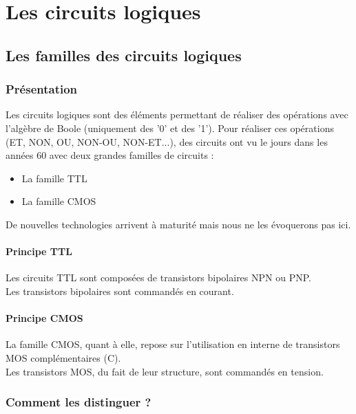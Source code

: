 \part{Les circuits logiques}
\chapter{Les familles des circuits logiques}

\section{Présentation}

Les circuits logiques sont des éléments permettant de réaliser des opérations avec l'algèbre de Boole (uniquement des '0' et des '1').
Pour réaliser ces opérations (ET, NON, OU, NON-OU, NON-ET...), des circuits ont vu le jours dans les années 60 avec deux grandes familles de circuits : \\
\begin{itemize}
    \item La famille TTL
    \item La famille CMOS
\end{itemize} 


De nouvelles technologies arrivent à maturité mais nous ne les évoquerons pas ici.

\subsection{Principe TTL}

Les circuits TTL sont composées de transistors bipolaires NPN ou PNP. \\
Les transistors bipolaires sont commandés en courant.


\subsection{Principe CMOS}

La famille CMOS, quant à elle, repose sur l'utilisation en interne de transistors MOS complémentaires (C). \\
Les transistors MOS, du fait de leur structure, sont commandés en tension.


\section{Comment les distinguer ?}

